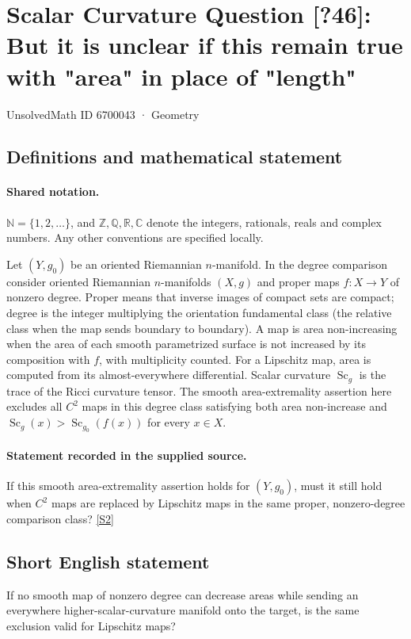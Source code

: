 \documentclass[11pt]{article}
\newcommand{\sref}[2]{\hyperlink{source:#1:#2}{[S#2]}}
\begin{document}
\setcounter{section}{6700042}
\section{Scalar Curvature Question [?46]: But it is unclear if this remain true with "area" in place of "length"}\label{6700043}
{\small\sffamily UnsolvedMath ID 6700043 · Geometry}
\subsection{Definitions and mathematical statement}

\paragraph{Shared notation.}$\mathbb N=\{1,2,\ldots\}$, and $\mathbb Z,\mathbb Q,\mathbb R,\mathbb C$ denote the integers, rationals, reals and complex numbers. Any other conventions are specified locally.


Let $(Y,g_0)$ be an oriented Riemannian $n$-manifold. In the degree comparison consider oriented Riemannian $n$-manifolds $(X,g)$ and proper maps $f:X\to Y$ of nonzero degree. Proper means that inverse images of compact sets are compact; degree is the integer multiplying the orientation fundamental class (the relative class when the map sends boundary to boundary). A map is area non-increasing when the area of each smooth parametrized surface is not increased by its composition with $f$, with multiplicity counted. For a Lipschitz map, area is computed from its almost-everywhere differential. Scalar curvature $\operatorname{Sc}_g$ is the trace of the Ricci curvature tensor. The smooth area-extremality assertion here excludes all $C^2$ maps in this degree class satisfying both area non-increase and $\operatorname{Sc}_g(x)>\operatorname{Sc}_{g_0}(f(x))$ for every $x\in X$.
\paragraph{Statement recorded in the supplied source.}
If this smooth area-extremality assertion holds for $(Y,g_0)$, must it still hold when $C^2$ maps are replaced by Lipschitz maps in the same proper, nonzero-degree comparison class? \sref{6700043}{2}
\subsection{Short English statement}
If no smooth map of nonzero degree can decrease areas while sending an everywhere higher-scalar-curvature manifold onto the target, is the same exclusion valid for Lipschitz maps?
\end{document}
